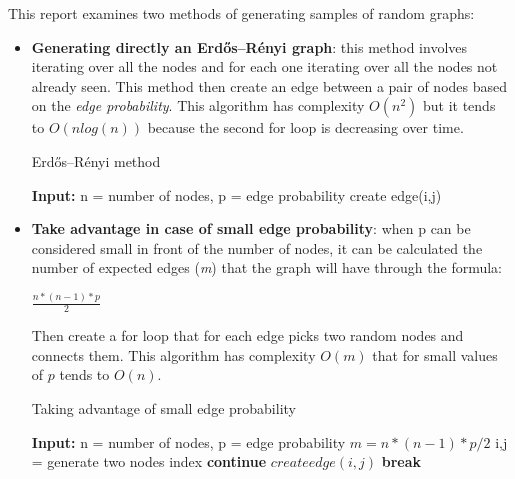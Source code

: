 \documentclass[conference]{IEEEtran}
\begin{document}
    This report examines two methods of generating samples of random graphs:
    \begin{itemize}
        \item \textbf{Generating directly an Erdős–Rényi graph}: this method involves iterating over all the nodes and for each one iterating over all the nodes not already seen. This method then create an edge between a pair of nodes based on the \textit{edge probability}. This algorithm has complexity $O(n^2)$ but it tends to $O(nlog(n))$ because the second for loop is decreasing over time.
        \begin{algorithm}
            \caption{Erdős–Rényi method}
            \label{alg:first}
            \begin{algorithmic}
                \STATE \textbf{Input:} n = number of nodes, p = edge probability
                            \STATE create edge(i,j)
                        \ENDIF
                    \ENDFOR
                \ENDFOR
            \end{algorithmic}
        \end{algorithm}

        \item \textbf{Take advantage in case of small edge probability}: when p can be considered small in front of the number of nodes, it can be calculated the number of expected edges (\textit{m}) that the graph will have through the formula:
        \begin{center}
            \begin{math}
                \frac{n*(n-1)*p}{2}
            \end{math}            
        \end{center}
        
        Then create a for loop that for each edge picks two random nodes and connects them. This algorithm has complexity $O(m)$ that for small values of $p$ tends to $O(n)$.
        \begin{algorithm}
            \caption{Taking advantage of small edge probability}
            \label{alg:second}
            \begin{algorithmic}
                \STATE \textbf{Input:} n = number of nodes, p = edge probability
                \STATE $m = n*(n-1)*p / 2$
                        \STATE i,j = generate two nodes index
                            \STATE \textbf{continue}
                        \ELSE
                            \STATE $create edge(i,j)$
                            \STATE \textbf{break}
                        \ENDIF
                    \ENDWHILE
                \ENDFOR
            \end{algorithmic}
        \end{algorithm}
    \end{itemize}
\end{document}
